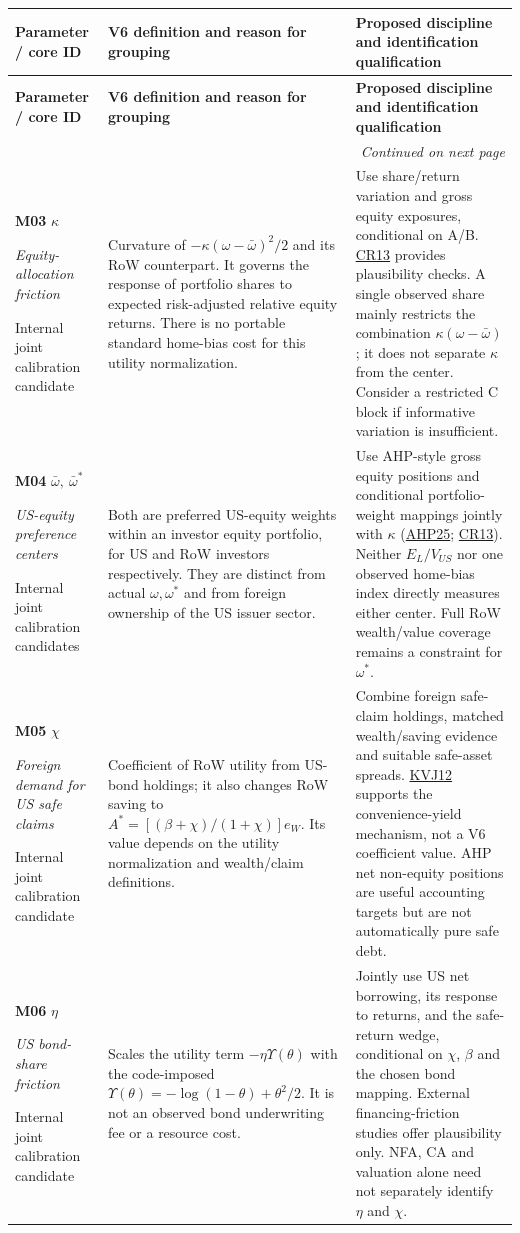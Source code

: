 \documentclass[10pt,a4paper,landscape]{article}
\makeatletter
\newcommand{\lit}[2]{\hyperlink{ref:#1}{#2}}
\newenvironment{grouptable}{%
\fontsize{9.4}{10.8}\selectfont\setlength{\parskip}{1.5pt}
\begin{longtable}{@{}P{\dimexpr .18\textwidth-6.67pt\relax}P{\dimexpr .385\textwidth-6.67pt\relax}P{\dimexpr .435\textwidth-6.66pt\relax}@{}}
\toprule\rowcolor{tablehead}\textbf{Parameter / core ID} & \textbf{V6 definition and reason for grouping} & \textbf{Proposed discipline and identification qualification}\\\midrule
\endfirsthead
\toprule\rowcolor{tablehead}\textbf{Parameter / core ID} & \textbf{V6 definition and reason for grouping} & \textbf{Proposed discipline and identification qualification}\\\midrule
\endhead
\midrule\multicolumn{3}{r}{\footnotesize\itshape Continued on next page}\\\endfoot
\bottomrule\endlastfoot
}{\end{longtable}}
\makeatother
\begin{document}
\begin{grouptable}
\textbf{M03} $\kappa$\par \textit{Equity-allocation friction}\par {\footnotesize Internal joint calibration candidate} & Curvature of $-\kappa(\omega-\bar\omega)^2/2$ and its RoW counterpart. It governs the response of portfolio shares to expected risk-adjusted relative equity returns. There is no portable standard home-bias cost for this utility normalization. & Use share/return variation and gross equity exposures, conditional on A/B. \lit{CR}{CR13} provides plausibility checks. A single observed share mainly restricts the combination $\kappa(\omega-\bar\omega)$; it does not separate $\kappa$ from the center. Consider a restricted C block if informative variation is insufficient.\\[5pt]
\textbf{M04} $\bar\omega,\ \bar\omega^*$\par \textit{US-equity preference centers}\par {\footnotesize Internal joint calibration candidates} & Both are preferred US-equity weights within an investor equity portfolio, for US and RoW investors respectively. They are distinct from actual $\omega,\omega^*$ and from foreign ownership of the US issuer sector. & Use AHP-style gross equity positions and conditional portfolio-weight mappings jointly with $\kappa$ (\lit{AHP}{AHP25}; \lit{CR}{CR13}). Neither $E_L/V_{US}$ nor one observed home-bias index directly measures either center. Full RoW wealth/value coverage remains a constraint for $\omega^*$.\\[5pt]
\textbf{M05} $\chi$\par \textit{Foreign demand for US safe claims}\par {\footnotesize Internal joint calibration candidate} & Coefficient of RoW utility from US-bond holdings; it also changes RoW saving to $A^*=[(\beta+\chi)/(1+\chi)]e_W$. Its value depends on the utility normalization and wealth/claim definitions. & Combine foreign safe-claim holdings, matched wealth/saving evidence and suitable safe-asset spreads. \lit{KVJ}{KVJ12} supports the convenience-yield mechanism, not a V6 coefficient value. AHP net non-equity positions are useful accounting targets but are not automatically pure safe debt.\\[5pt]
\textbf{M06} $\eta$\par \textit{US bond-share friction}\par {\footnotesize Internal joint calibration candidate} & Scales the utility term $-\eta\Upsilon(\theta)$ with the code-imposed $\Upsilon(\theta)=-\log(1-\theta)+\theta^2/2$. It is not an observed bond underwriting fee or a resource cost. & Jointly use US net borrowing, its response to returns, and the safe-return wedge, conditional on $\chi$, $\beta$ and the chosen bond mapping. External financing-friction studies offer plausibility only. NFA, CA and valuation alone need not separately identify $\eta$ and $\chi$.\\[5pt]
\end{grouptable}
\end{document}
